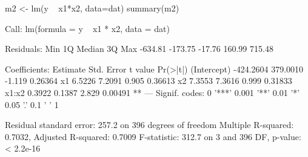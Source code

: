 \begin{Schunk}
\begin{Sinput}
 m2 <- lm(y ~ x1*x2, data=dat)
 summary(m2)
\end{Sinput}
\begin{Soutput}
Call:
lm(formula = y ~ x1 * x2, data = dat)

Residuals:
    Min      1Q  Median      3Q     Max 
-634.81 -173.75  -17.76  160.99  715.48 

Coefficients:
             Estimate Std. Error t value Pr(>|t|)   
(Intercept) -424.2604   379.0010  -1.119  0.26364   
x1             6.5226     7.2091   0.905  0.36613   
x2             7.3553     7.3616   0.999  0.31833   
x1:x2          0.3922     0.1387   2.829  0.00491 **
---
Signif. codes:  0 '***' 0.001 '**' 0.01 '*' 0.05 '.' 0.1 ' ' 1

Residual standard error: 257.2 on 396 degrees of freedom
Multiple R-squared:  0.7032,	Adjusted R-squared:  0.7009 
F-statistic: 312.7 on 3 and 396 DF,  p-value: < 2.2e-16
\end{Soutput}
\end{Schunk}
